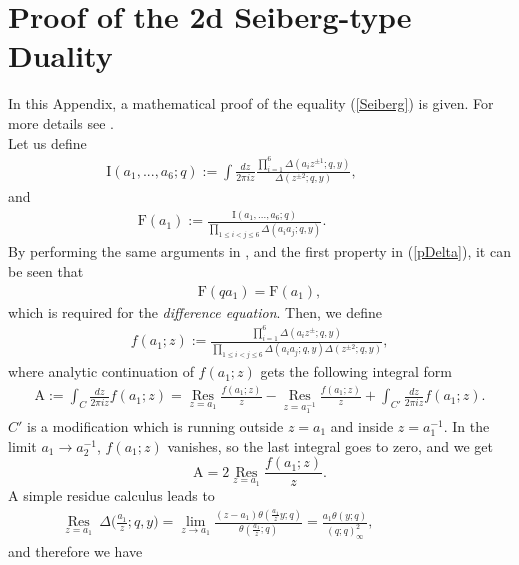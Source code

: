 \documentclass[a4paper,11pt]{article}%
\numberwithin{equation}{section}
\begin{document}
\section{ Proof of the 2d Seiberg-type Duality }  \label{proof}
In this Appendix, a mathematical proof of the equality (\ref{Seiberg}) is given. For more details see \cite{Rosengren:2016qtr,Spirdonov:Sh}.\\ Let us define
\begin{align}
  \text{I}(a_1,...,a_6;q):=\int \frac{dz}{2\pi i z} \frac{\prod_{i=1}^6\Delta(a_iz^{\pm1};q,y)}{\Delta(z^{\pm2};q,y)},\qquad \qquad
     \end{align}
     and
\begin{align}
 \qquad \text{F}(a_1):=\frac{\text{I}(a_1,...,a_6;q)}{\prod_{1\leq i<j\leq 6}\Delta(a_ia_j;q,y)}.\qquad\qquad\qquad
\end{align}
By performing the same arguments in \cite{Spirdonov:Sh}, and the first property in (\ref{pDelta}), it can be seen that
\begin{align}
  \text{F}(qa_1)=\text{F}(a_1),
\end{align}
which is required for the \emph{difference equation}.
Then, we define 
\begin{align}\label{f}
  f(a_1;z):=\frac{\prod_{i=1}^6\Delta(a_iz^{\pm};q,y)}{\prod_{1\leq i<j\leq 6}\Delta(a_ia_j;q,y)\Delta(z^{\pm2};q,y)},
\end{align}
where analytic continuation of $f(a_1;z)$  gets the following integral form
\begin{align}
  \text{A}:= \int_{C} \frac{dz}{2\pi i z} f(a_1;z)=\underset{z=a_1}{\operatorname{Res}}\frac{f(a_1;z)}{z}- \underset{z=a_1^{-1}}{\operatorname{Res}} \frac{f(a_1;z)}{z}+ \int_{C'} \frac{dz}{2\pi i z} f(a_1;z).
\end{align}
$C'$ is a modification which is  running outside $z=a_1$ and inside $z=a_1^{-1}$. In the limit $ a_1\rightarrow a_2^{-1}$, $f(a_1;z)$ vanishes, so the last integral goes to zero, and we get
\begin{equation}\label{A}
\text{A} = 2 \underset{z=a_1}{\operatorname{Res}}\frac{f(a_1;z)}{z}.
\end{equation}
A simple residue calculus leads to
\begin{align}
  \underset{z=a_1}{\operatorname{Res}} \ \Delta \Big(\frac{a_1}{z};q,y \Big)= \lim_{z \to a_1} \frac{(z-a_1)\theta(\frac{a_1}{z}y;q)}{\theta(\frac{a_1}{z};q)}=\frac{a_1\theta(y;q)}{(q;q)^2_{\infty}},\qquad\qquad\qquad
\end{align}
and therefore we have
\end{document}
